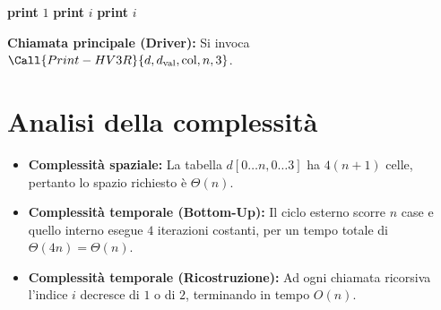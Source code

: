 \begin{algorithm}[htbp]
\caption{Ricostruzione dell'insieme ottimo di case per HV3R}
\begin{algorithmic}[1]
        \State \Return
            \State \textbf{print} $1$
        \EndIf
        \State \Return
    \Else
                \State {}
                \State \textbf{print} $i$
            \Else
                \State {}
            \EndIf
        \Else
                \State {}
            \Else
                    \State {}
                    \State \textbf{print} $i$
                \Else
                    \State {}
                \EndIf
            \EndIf
        \EndIf
    \EndIf
\EndProcedure
\end{algorithmic}
\end{algorithm}

\noindent
\textbf{Chiamata principale (Driver):} Si invoca $\Call{Print-HV3R}{d, d_{\text{val}}, \text{col}, n, 3}$.

\section{Analisi della complessità}
\begin{itemize}
    \item \textbf{Complessità spaziale:} La tabella $d[0 \dots n, 0 \dots 3]$ ha $4(n+1)$ celle, pertanto lo spazio richiesto è $\Theta(n)$.
    \item \textbf{Complessità temporale (Bottom-Up):} Il ciclo esterno scorre $n$ case e quello interno esegue $4$ iterazioni costanti, per un tempo totale di $\Theta(4n) = \Theta(n)$.
    \item \textbf{Complessità temporale (Ricostruzione):} Ad ogni chiamata ricorsiva l'indice $i$ decresce di $1$ o di $2$, terminando in tempo $O(n)$.
\end{itemize}